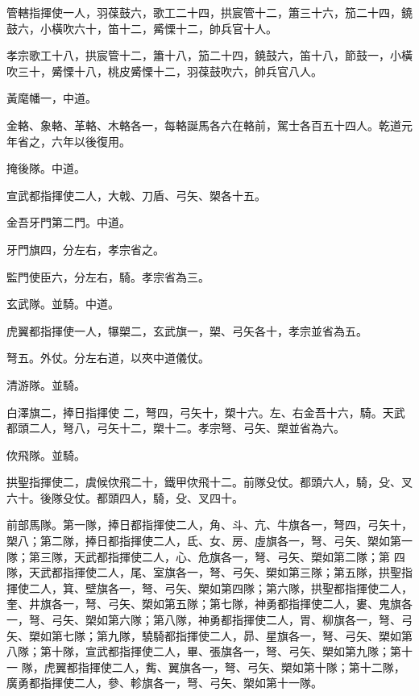 \begin{pinyinscope}
 管轄指揮使一人，羽葆鼓六，歌工二十四，拱宸管十二，簫三十六，笳二十四，鐃鼓六，小橫吹六十，笛十二，觱慄十二，帥兵官十人。



 孝宗歌工十八，拱宸管十二，簫十八，笳二十四，鐃鼓六，笛十八，節鼓一，小橫吹三十，觱慄十八，桃皮觱慄十二，羽葆鼓吹六，帥兵官八人。



 黃麾幡一，中道。



 金輅、象輅、革輅、木輅各一，每輅誕馬各六在輅前，駕士各百五十四人。乾道元年省之，六年以後復用。



 掩後隊。中道。



 宣武都指揮使二人，大戟、刀盾、弓矢、槊各十五。



 金吾牙門第二門。中道。



 牙門旗四，分左右，孝宗省之。



 監門使臣六，分左右，騎。孝宗省為三。



 玄武隊。並騎。中道。



 虎翼都指揮使一人，犦槊二，玄武旗一，槊、弓矢各十，孝宗並省為五。



 弩五。外仗。分左右道，以夾中道儀仗。



 清游隊。並騎。



 白澤旗二，捧日指揮使
 二，弩四，弓矢十，槊十六。左、右金吾十六，騎。天武都頭二人，弩八，弓矢十二，槊十二。孝宗弩、弓矢、槊並省為六。



 佽飛隊。並騎。



 拱聖指揮使二，虞候佽飛二十，鐵甲佽飛十二。前隊殳仗。都頭六人，騎，殳、叉六十。後隊殳仗。都頭四人，騎，殳、叉四十。



 前部馬隊。第一隊，捧日都指揮使二人，角、斗、亢、牛旗各一，弩四，弓矢十，槊八；第二隊，捧日都指揮使二人，氐、女、房、虛旗各一，弩、弓矢、槊如第一隊；第三隊，天武都指揮使二人，心、危旗各一，弩、弓矢、槊如第二隊；第
 四隊，天武都指揮使二人，尾、室旗各一，弩、弓矢、槊如第三隊；第五隊，拱聖指揮使二人，箕、壁旗各一，弩、弓矢、槊如第四隊；第六隊，拱聖都指揮使二人，奎、井旗各一，弩、弓矢、槊如第五隊；第七隊，神勇都指揮使二人，婁、鬼旗各一，弩、弓矢、槊如第六隊；第八隊，神勇都指揮使二人，胃、柳旗各一，弩、弓矢、槊如第七隊；第九隊，驍騎都指揮使二人，昴、星旗各一，弩、弓矢、槊如第八隊；第十隊，宣武都指揮使二人，畢、張旗各一，弩、弓矢、槊如第九隊；第十一
 隊，虎翼都指揮使二人，觜、翼旗各一，弩、弓矢、槊如第十隊；第十二隊，廣勇都指揮使二人，參、軫旗各一，弩、弓矢、槊如第十一隊。




\end{pinyinscope}
